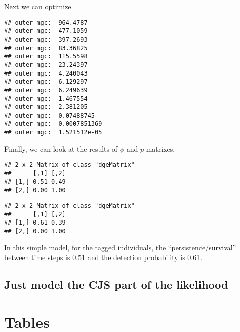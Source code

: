 \documentclass[
]{article}
\newenvironment{Shaded}{\begin{snugshade}}{\end{snugshade}}
\newcommand{\CommentTok}[1]{\textcolor[rgb]{0.56,0.35,0.01}{\textit{#1}}}
\newcommand{\DecValTok}[1]{\textcolor[rgb]{0.00,0.00,0.81}{#1}}
\newcommand{\FunctionTok}[1]{\textcolor[rgb]{0.00,0.00,0.00}{#1}}
\newcommand{\NormalTok}[1]{#1}
\newcommand{\SpecialCharTok}[1]{\textcolor[rgb]{0.00,0.00,0.00}{#1}}
\begin{document}
Next we can optimize.

\begin{verbatim}
## outer mgc:  964.4787 
## outer mgc:  477.1059 
## outer mgc:  397.2693 
## outer mgc:  83.36825 
## outer mgc:  115.5598 
## outer mgc:  23.24397 
## outer mgc:  4.240043 
## outer mgc:  6.129297 
## outer mgc:  6.249639 
## outer mgc:  1.467554 
## outer mgc:  2.381205 
## outer mgc:  0.07488745 
## outer mgc:  0.0007851369 
## outer mgc:  1.521512e-05
\end{verbatim}

Finally, we can look at the results of \(\phi\) and \(p\) matrixes,

\begin{Shaded}
\end{Shaded}

\begin{verbatim}
## 2 x 2 Matrix of class "dgeMatrix"
##      [,1] [,2]
## [1,] 0.51 0.49
## [2,] 0.00 1.00
\end{verbatim}

\begin{Shaded}
\end{Shaded}

\begin{verbatim}
## 2 x 2 Matrix of class "dgeMatrix"
##      [,1] [,2]
## [1,] 0.61 0.39
## [2,] 0.00 1.00
\end{verbatim}

In this simple model, for the tagged individuals, the
``persistence/survival'' between time steps is 0.51 and the detection
probability is 0.61.

\hypertarget{just-model-the-cjs-part-of-the-likelihood-1}{%
\subsection{Just model the CJS part of the
likelihood}\label{just-model-the-cjs-part-of-the-likelihood-1}}

\hypertarget{tables}{%
\section{Tables}\label{tables}}
\end{document}
